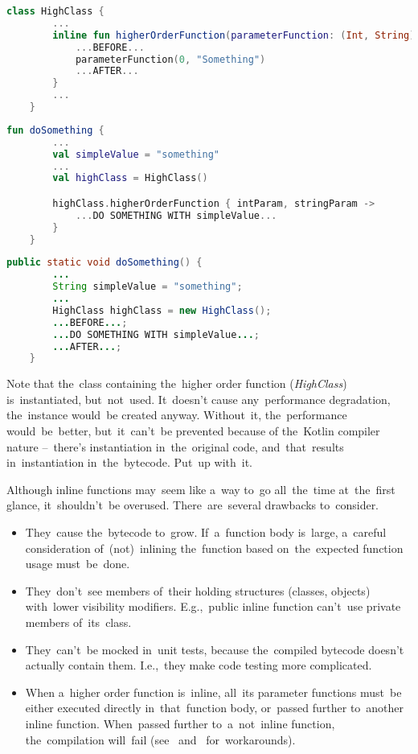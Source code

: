 \example
\begin{lstlisting}[language=Kotlin, title={Inlined function of higher order}]
    class HighClass {
        ...
        inline fun higherOrderFunction(parameterFunction: (Int, String) -> WHATEVER) {
            ...BEFORE...
            parameterFunction(0, "Something")
            ...AFTER...
        }
        ...
    }
\end{lstlisting}
\begin{lstlisting}[language=Kotlin, title={Calling the~inline function}]
    fun doSomething {
        ...
        val simpleValue = "something"
        ...
        val highClass = HighClass()

        highClass.higherOrderFunction { intParam, stringParam ->
            ...DO SOMETHING WITH simpleValue...
        }
    }
\end{lstlisting}
\begin{lstlisting}[language=Java, title={Rough Java equivalent of the generated bytecode}]
    public static void doSomething() {
        ...
        String simpleValue = "something";
        ...
        HighClass highClass = new HighClass();
        ...BEFORE...;
        ...DO SOMETHING WITH simpleValue...;
        ...AFTER...;
    }
\end{lstlisting}

\noindent Note that the~class containing the~higher order function \mbox{(\textit{HighClass})} is~instantiated, but~not~used.
It~doesn't cause any~performance degradation, the~instance would~be created anyway.
Without~it, the~performance would~be~better, but~it~can't~be prevented because of the~Kotlin compiler nature --~there's instantiation in~the~original code, and~that~results in~instantiation in~the~bytecode.
Put~up with~it.

Although inline functions may~seem like a~way to~go all~the~time at~the~first glance, it~shouldn't~be overused.
There~are~several drawbacks to~consider.

\begin{itemize}
    \item They~cause the~bytecode to~grow.
          If~a~function body is~large, a~careful consideration of~(not)~inlining the~function based on~the~expected function usage must~be~done.
    \item They~don't~see members of~their holding structures (classes, objects) with~lower visibility modifiers.
          E.g.,~public inline function can't~use private members of~its~class.
    \item They~can't~be mocked in~unit tests, because the~compiled bytecode doesn't actually contain them.
          I.e.,~they make code testing more complicated.
    \item When a~higher order function is~inline, all~its parameter functions must~be either executed directly in~that~function body, or~passed further to~another inline function.
          When~passed further to~a~not~inline function, the~compilation will~fail (see~\hyperref[kotlinoinline]{} and~\hyperref[kotlincrossinline]{} for~workarounds).
\end{itemize}

